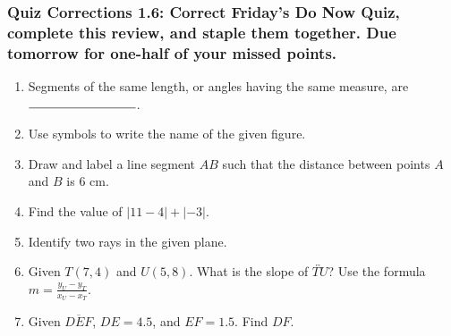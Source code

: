 \documentclass[12pt, oneside]{article}
\begin{document}
\newpage
\subsubsection*{Quiz Corrections 1.6: Correct Friday's Do Now Quiz, complete this review, and staple them together. Due tomorrow for one-half of your missed points.} \bigskip
\begin{enumerate}
  \item Segments of the same length, or angles having the same measure, are \ $\rule{3cm}{0.15mm}$.
  \bigskip

  \item Use symbols to write the name of the given figure.
     \bigskip

  \item Draw and label a line segment $AB$ such that the distance between points $A$ and $B$ is 6 cm. \vspace{2cm}

  \item Find the value of $|11-4|+|-3|$.

  \item Identify two rays in the given plane.\\[0.25in]

  \item Given $T(7,4)$ and $U(5,8)$. What is the slope of $\overleftrightarrow{TU}$? Use the formula $\displaystyle m=\frac{y_U-y_T}{x_U-x_T}$. \vspace{3cm}

  \item Given $\overline{DEF}$, $DE=4.5$, and $EF=1.5$. Find ${DF}$.\\[0.75cm]
       \smallskip


\end{enumerate}
\end{document}
